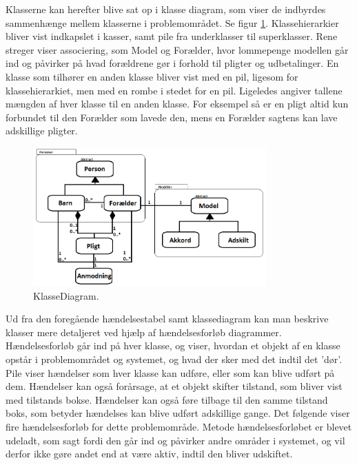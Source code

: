 Klasserne kan herefter blive sat op i klasse diagram, som viser de indbyrdes sammenhænge mellem klasserne i problemområdet. Se figur \ref{KlasseDiagram}. Klassehierarkier bliver vist indkapslet i kasser, samt pile fra underklasser til superklasser. Rene streger viser associering, som Model og Forælder, hvor lommepenge modellen går ind og påvirker på hvad forældrene gør i forhold til pligter og udbetalinger. En klasse som tilhører en anden klasse bliver vist med en pil, ligesom for klassehierarkiet, men med en rombe i stedet for en pil. Ligeledes angiver tallene mængden af hver klasse til en anden klasse. For eksempel så er en pligt altid kun forbundet til den Forælder som lavede den, mens en Forælder sagtens kan lave adskillige pligter.

\begin{figure}[H]
\centering
\includegraphics[width=0.8\textwidth]{Billeder/KlasseDiagram.png}
\caption{KlasseDiagram.}
\label{KlasseDiagram}
\end{figure}

Ud fra den foregående hændelsestabel samt klassediagram kan man beskrive klasser mere detaljeret ved hjælp af hændelsesforløb diagrammer. Hændelsesforløb går ind på hver klasse, og viser, hvordan et objekt af en klasse opstår i problemområdet og systemet, og hvad der sker med det indtil det ’dør’. Pile viser hændelser som hver klasse kan udføre, eller som kan blive udført på dem. Hændelser kan også forårsage, at et objekt skifter tilstand, som bliver vist med tilstands bokse. Hændelser kan også føre tilbage til den samme tilstand boks, som betyder hændelses kan blive udført adskillige gange. Det følgende viser fire hændelsesforløb for dette problemområde. Metode hændelsesforløbet er blevet udeladt, som sagt fordi den går ind og påvirker andre områder i systemet, og vil derfor ikke gøre andet end at være aktiv, indtil den bliver udskiftet.

